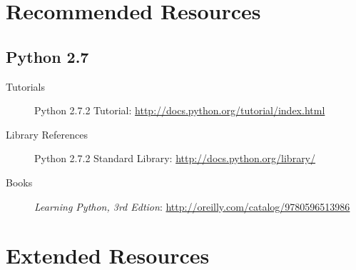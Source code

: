 \documentclass{report}
\begin{document}
\chapter{Recommended Resources}
\section{Python 2.7}
\begin{description}
	\item[Tutorials]
Python 2.7.2 Tutorial: \url{http://docs.python.org/tutorial/index.html} \cite{website:Python272docs}
	\item[Library References]
Python 2.7.2 Standard Library:  \url{http://docs.python.org/library/} \cite{website:Python272docs}
	\item[Books]
\emph{Learning Python, 3rd Edtion}: \url{http://oreilly.com/catalog/9780596513986}  \cite{LearningPython3rd}
\end{description}

\chapter{Extended Resources}
\end{document}
